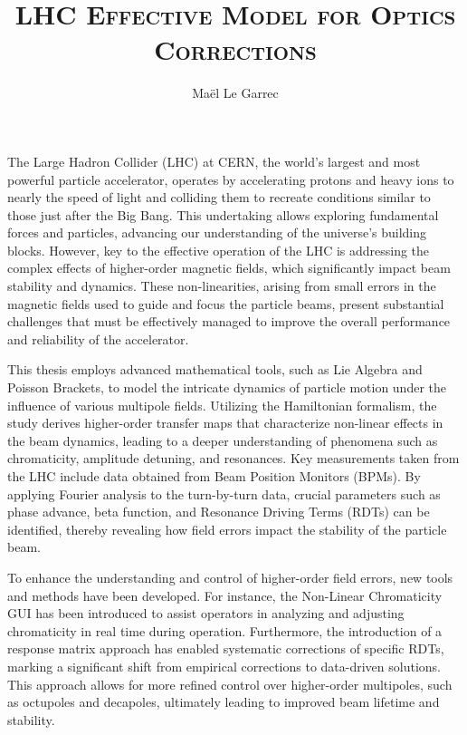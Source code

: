 \documentclass{article}
\title{\scshape{LHC Effective Model for Optics Corrections}}
\author{Maël Le Garrec}
\date{}
\begin{document}
\maketitle


The Large Hadron Collider (LHC) at CERN, the world's largest and most powerful particle accelerator,
operates by accelerating protons and heavy ions to nearly the speed of light and colliding them to
recreate conditions similar to those just after the Big Bang. This undertaking allows
exploring fundamental forces and particles, advancing our understanding of the universe's building
blocks. However, key to the effective operation of the LHC is addressing the complex effects of
higher-order magnetic fields, which significantly impact beam stability and dynamics. These
non-linearities, arising from small errors in the magnetic fields used to guide and focus the
particle beams, present substantial challenges that must be effectively managed to improve the
overall performance and reliability of the accelerator.

This thesis employs advanced mathematical tools, such as Lie Algebra and Poisson Brackets, to model
the intricate dynamics of particle motion under the influence of various multipole fields. Utilizing
the Hamiltonian formalism, the study derives higher-order transfer maps that characterize non-linear
effects in the beam dynamics, leading to a deeper understanding of phenomena such as chromaticity,
amplitude detuning, and resonances. Key measurements taken from the LHC include data obtained from
Beam Position Monitors (BPMs). By applying Fourier analysis to the turn-by-turn data, crucial
parameters such as phase advance, beta function, and Resonance Driving Terms (RDTs) can be
identified, thereby revealing how field errors impact the stability of the particle beam.

To enhance the understanding and control of higher-order field errors, new tools and methods have
been developed. For instance, the Non-Linear Chromaticity GUI has been introduced to assist
operators in analyzing and adjusting chromaticity in real time during operation. Furthermore, the
introduction of a response matrix approach has enabled systematic corrections of specific RDTs,
marking a significant shift from empirical corrections to data-driven solutions. This approach
allows for more refined control over higher-order multipoles, such as octupoles and decapoles,
ultimately leading to improved beam lifetime and stability.
\end{document}

